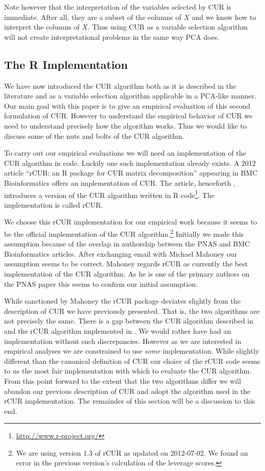 \documentclass{book}
\begin{document}
Note however that the interpretation of the variables selected by CUR is immediate. After all, they are a subset of the columns of $X$ and we know how to interpret the columns of $X$. Thus using CUR as a variable selection algorithm will not create interpretational problems in the same way PCA does. 

\subsection{The R Implementation}

We have now introduced the CUR algorithm both as it is described in the literature and as a variable selection algorithm applicable in a PCA-like manner. Our main goal with this paper is to give an empirical evaluation of this second formulation of CUR. However to understand the empirical behavior of CUR we need to understand precisely how the algorithm works. Thus we would like to discuss some of the nuts and bolts of the CUR algorithm. 

To carry out our empirical evaluations we will need an implementation of the CUR algorithm in code. Luckily one such implementation already exists. A 2012 article ``rCUR: an R package for CUR matrix decomposition'' appearing in BMC Bioinformatics offers an implementation of CUR. The article, henceforth \cite{biomed}, introduces a version of the CUR algorithm written in R code\footnote{\href{http://www.r-project.org/}{http://www.r-project.org/}}. The implementation is called rCUR.

We choose this rCUR implementation for our empirical work because it seems to be the official implementation of the CUR algorithm.\footnote{We are using version 1.3 of rCUR as updated on 2012-07-02. We found an error in the previous version's calculation of the leverage scores.} Initially we made this assumption because of the overlap in authorship between the PNAS and BMC Bioinformatics articles. After exchanging email with Michael Mahoney our assumption seems to be correct. Mahoney regards rCUR as currently the best implementation of the CUR algorithm. As he is one of the primary authors on the PNAS paper this seems to confirm our initial assumption. 

While sanctioned by Mahoney the rCUR package deviates slightly from the description of CUR we have previously presented. That is, the two algorithms are not precisely the same. There is a gap between the CUR algorithm described in \cite{pnas} and the rCUR algorithm implemented in \cite{biomed}.  We would rather have had an implementation without such discrepancies. However as we are interested in empirical analyses we are constrained to use \emph{some} implementation. While slightly different than the canonical definition of CUR our choice of the rCUR code seems to us the most fair implementation with which to evaluate the CUR algorithm. From this point forward to the extent that the two algorithms differ we will abandon our previous description of CUR and adopt the algorithm used in the rCUR implementation. The remainder of this section will be a discussion to this end. 
\end{document}
